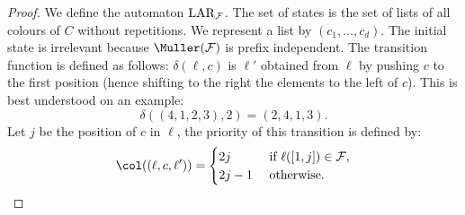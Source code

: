 \begin{proof}
We define the automaton $\mathrm{LAR}_{\mathcal{F}}$.
The set of states is the set of lists of all colours of $C$ without repetitions.
We represent a list by $(c_1,\dots,c_d)$.
The initial state is irrelevant because $\Muller(\F)$ is prefix independent.
The transition function is defined as follows: 
$\delta(\ell, c)$ is $\ell'$ obtained from $\ell$ by pushing $c$ to the first position (hence shifting to the right the elements to the left of $c$). 
This is best understood on an example: 
\[
\delta( (4, 1, 2, 3), 2) = (2, 4, 1, 3).
\]
Let $j$ be the position of $c$ in $\ell$, the priority of this transition is defined by:
\[
\col((\ell,c,\ell')) =
\begin{cases}
2 j      & \text{ if } \ell([1,j]) \in \F, \\
2 j - 1  & \text{ otherwise.}
\end{cases}
\]


\end{proof}
